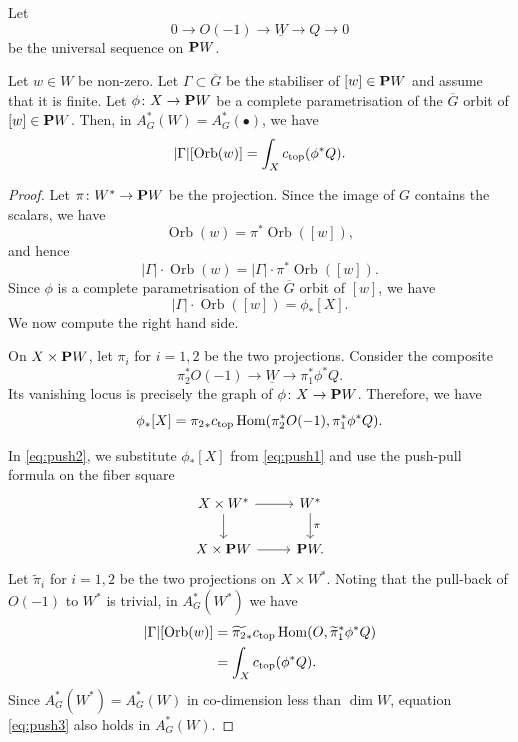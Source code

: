\documentclass[11pt]{amsart}
\renewcommand {\P}{{\bf P}}
\providecommand{\Hom}{\operatorname{Hom}}
\DeclareMathOperator{\Orb}{Orb}
\begin{document}
Let
\[ 0 \to O(-1) \to \underline W \to Q \to 0\]
be the universal sequence on \(\P W\).
\begin{proposition}\label{prop:intzeta}
  Let \(w \in W\) be non-zero.
  Let \(\Gamma \subset \overline G\) be the stabiliser of \([w] \in \P W\) and assume that it is finite.
  Let \(\phi \colon X \to \P W\) be a complete parametrisation of the \(\overline G\) orbit of \([w] \in \P W\).
  Then, in \(A^*_G(W) = A^*_G(\bullet)\), we have
  \[ |\Gamma| [\Orb(w)] = \int_X c_{\rm top}(\phi^* Q).\]
\end{proposition}
\begin{proof}
  Let \(\pi \colon W^* \to \P W\) be the projection.
  Since the image of \(G\) contains the scalars, we have
  \[ \Orb(w) = \pi^* \Orb([w]),\]
  and hence
  \begin{equation}\label{eq:push2}
    |\Gamma| \cdot \Orb(w) = |\Gamma| \cdot \pi^* \Orb([w]).
  \end{equation}
  Since \(\phi\) is a complete parametrisation of the \(\overline G\) orbit of \([w]\), we have
  \[ |\Gamma| \cdot \Orb([w]) = \phi_*[X].\]
  We now compute the right hand side.
  
  On \(X \times \P W\), let \(\pi_i\) for \(i = 1,2\) be the two projections.
  Consider the composite
  \[ \pi_2^*O(-1) \to \underline W \to \pi_1^*\phi^*Q.\]
  Its vanishing locus is precisely the graph of \(\phi \colon X \to \P W\).
  Therefore, we have
  \begin{equation}\label{eq:push1}
    \phi_*[X] = {\pi_2}_* c_{\rm top} \Hom(\pi_2^*O(-1), \pi_1^* \phi^*Q).
  \end{equation}

  In \eqref{eq:push2}, we substitute \(\phi_*[X]\) from \eqref{eq:push1} and use the push-pull formula on the fiber square
  \[
    \begin{tikzcd}
      X \times W^* \ar{r}\ar{d}& W^* \ar{d}{\pi}\\
      X \times \P W \ar{r}& \P W.
    \end{tikzcd}
  \]
  Let \(\widetilde \pi_i\) for \(i = 1,2\) be the two projections on \(X \times W^*\).
  Noting that the pull-back of \(O(-1)\) to \(W^*\) is trivial, in \(A^*_G(W^*)\) we have
  \begin{equation}\label{eq:push3}
    \begin{split}
      |\Gamma|[\Orb(w)] &= {\widetilde {\pi_2}}_* c_{\rm top} \Hom(O, \widetilde \pi_1^* \phi^*Q)\\
      &= \int_X c_{\rm top}(\phi^*Q).
    \end{split}
  \end{equation}
  Since \(A^*_G(W^*) = A^*_G(W)\) in co-dimension less than \(\dim W\), equation \eqref{eq:push3} also holds in \(A^*_G(W)\).
\end{proof}
\end{document}
